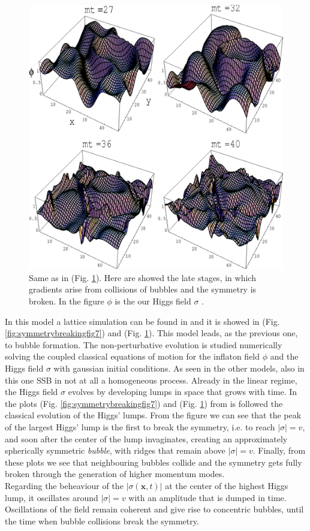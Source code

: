 \documentclass[11pt,a4paper,twoside]{book}
\begin{document}
\begin{figure}
	\centering
	\includegraphics[width=0.6\linewidth, height=0.4\textheight]{Images/Chap5/SymmetryBreaking_Fig8}
	\caption{Same as in (Fig. \ref{fig:symmetrybreakingfig8}). Here are showed the late stages, in which gradients arise from collisions of bubbles and the symmetry is broken. In the figure $\phi$ is the our Higgs field $\sigma$ \cite{Chap5:FalseVacuumDecay}.}
	\label{fig:symmetrybreakingfig8}
\end{figure}
In this model a lattice simulation can be found in \cite{Chap5:FalseVacuumDecay} and it is showed in (Fig. \ref{fig:symmetrybreakingfig7}) and (Fig. \ref{fig:symmetrybreakingfig8}).  This model leads, as the previous one, to bubble formation. The non-perturbative evolution is studied numerically solving the coupled classical equations of motion for the inflaton field $\phi$ and the Higgs field $\sigma$ with gaussian initial conditions. 
As seen in the other models, also in this one SSB in not at all a homogeneous process. Already in the linear regime, the Higgs field $\sigma$ evolves by developing lumps in space that grows with time. In the plots (Fig. \ref{fig:symmetrybreakingfig7})  and (Fig. \ref{fig:symmetrybreakingfig8}) from \cite{Chap5:FalseVacuumDecay} is followed the classical evolution of the Higgs' lumps. From the figure we can see that the peak of the largest  Higgs' lump is the first to break the symmetry, i.e. to reach $ |\sigma|=v $, and soon after the center of the lump invaginates, creating an approximately spherically symmetric \textit{bubble}, with ridges that remain above $ |\sigma|=v $. Finally, from these plots we see that neighbouring bubbles collide and the symmetry gets fully broken through the generation of higher momentum modes.\\
Regarding the beheaviour of the $ |\sigma(\textbf{x},t)| $ at the center of the highest Higgs lump, it oscillates around $ |\sigma|=v $ with an amplitude that is dumped in time. Oscillations of the field remain coherent and give rise to concentric bubbles, until the time when bubble collisions break the symmetry.
\end{document}
